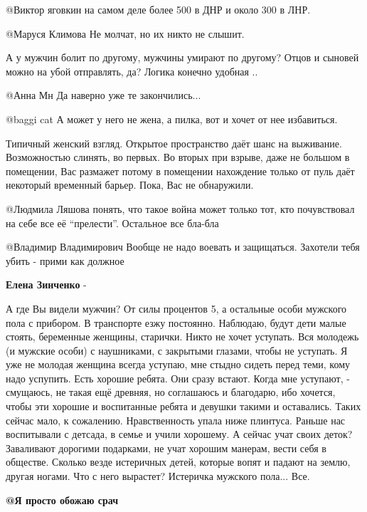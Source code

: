 \begin{itemize}
@Виктор яговкин  на самом деле более 500 в ДНР и около 300 в ЛНР.

@Маруся Климова  Не молчат, но их никто не слышит.


А у мужчин болит по другому, мужчины умирают по другому? Отцов и сыновей можно
на убой отправлять, да? Логика конечно удобная ..

 @Анна Мн  Да наверно уже те закончились...

 @baggi cat  А может у него не жена, а пилка, вот и хочет от нее избавиться.


Типичный женский взгляд. Открытое пространство даёт шанс на
выживание. Возможностью слинять, во первых. Во вторых при взрыве, даже не большом в
помещении, Вас размажет потому в помещении нахождение только от пуль даёт
некоторый временный барьер. Пока, Вас не обнаружили. 

@Людмила Ляшова понять, что такое война может только тот, кто почувствовал
на себе все её \enquote{прелести}. Остальное все бла-бла

@Владимир Владимирович  Вообще не надо воевать и защищаться. Захотели тебя убить - прими как должное

\textbf{Елена Зинченко} - 

А где Вы видели мужчин? От силы процентов 5, а остальные особи мужского пола с
прибором. В транспорте езжу постоянно. Наблюдаю, будут дети малые стоять,
беременные женщины, старички. Никто не хочет уступать. Вся молодежь (и мужские
особи) с наушниками, с закрытыми глазами, чтобы не уступать. Я уже не молодая
женщина всегда уступаю, мне стыдно сидеть перед теми, кому надо успупить. Есть
хорошие ребята. Они сразу встают. Когда мне уступают, - смущаюсь, не такая ещё
древняя, но соглашаюсь и благодарю, ибо хочется, чтобы эти хорошие и
воспитанные ребята и девушки такими и оставались. Таких сейчас мало, к
сожалению.  Нравственность упала ниже плинтуса. Раньше нас воспитывали с
детсада, в семье и учили хорошему. А сейчас учат своих деток? Заваливают
дорогими подарками, не учат хорошим манерам, вести себя в обществе. Сколько
везде истеричных детей, которые вопят и падают на землю, другая ногами. Что с
него вырастет? Истеричка мужского пола... Все. 

\textbf{@Я просто обожаю срач}  


\end{itemize}
